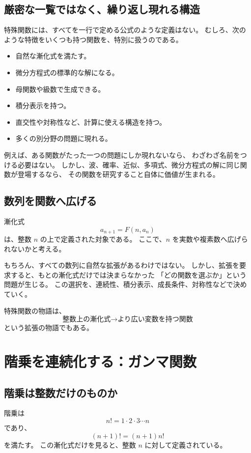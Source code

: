 \subsection{厳密な一覧ではなく、繰り返し現れる構造}

特殊関数には、すべてを一行で定める公式のような定義はない。
むしろ、次のような特徴をいくつも持つ関数を、特別に扱うのである。

\begin{itemize}
  \item 自然な漸化式を満たす。
  \item 微分方程式の標準的な解になる。
  \item 母関数や級数で生成できる。
  \item 積分表示を持つ。
  \item 直交性や対称性など、計算に使える構造を持つ。
  \item 多くの別分野の問題に現れる。
\end{itemize}

例えば、ある関数がたった一つの問題にしか現れないなら、
わざわざ名前をつける必要はない。
しかし、波、確率、近似、多項式、微分方程式の解に同じ関数が登場するなら、
その関数を研究すること自体に価値が生まれる。

\subsection{数列を関数へ広げる}

漸化式
\[
  a_{n+1}=F(n,a_n)
\]
は、整数 $n$ の上で定義された対象である。
ここで、$n$ を実数や複素数へ広げられないかと考える。

もちろん、すべての数列に自然な拡張があるわけではない。
しかし、拡張を要求すると、もとの漸化式だけでは決まらなかった
「どの関数を選ぶか」という問題が生じる。
この選択を、連続性、積分表示、成長条件、対称性などで決めていく。

特殊関数の物語は、
\[
  \text{整数上の漸化式}
  \longrightarrow
  \text{より広い変数を持つ関数}
\]
という拡張の物語でもある。

\section{階乗を連続化する：ガンマ関数}

\subsection{階乗は整数だけのものか}

階乗は
\[
  n!=1\cdot2\cdot3\cdots n
\]
であり、
\[
  (n+1)!=(n+1)n!
\]
を満たす。
この漸化式だけを見ると、整数 $n$ に対して定義されている。


